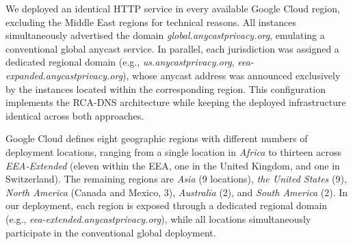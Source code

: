 \documentclass[acmsmall]{acmart}
\begin{document}
We deployed an identical HTTP service in every available Google Cloud region, excluding the Middle East regions for technical reasons. All instances simultaneously advertised the domain \textit{global.anycastprivacy.org}, emulating a conventional global anycast service. In parallel, each jurisdiction was assigned a dedicated regional domain (e.g., \textit{us.anycastprivacy.org}, \textit{eea-expanded.anycastprivacy.org}), whose anycast address was announced exclusively by the instances located within the corresponding region. This configuration implements the RCA-DNS architecture while keeping the deployed infrastructure identical across both approaches. 

Google Cloud defines eight geographic regions with different numbers of deployment locations, ranging from a single location in \textit{Africa} to thirteen across \textit{EEA-Extended} (eleven within the EEA, one in the United Kingdom, and one in Switzerland). The remaining regions are \textit{Asia} (9 locations), \textit{the United States} (9), \textit{North America} (Canada and Mexico, 3), \textit{Australia} (2), and \textit{South America} (2). In our deployment, each region is exposed through a dedicated regional domain (e.g., \textit{eea-extended.anycastprivacy.org}), while all locations simultaneously participate in the conventional global deployment.

\end{document}
